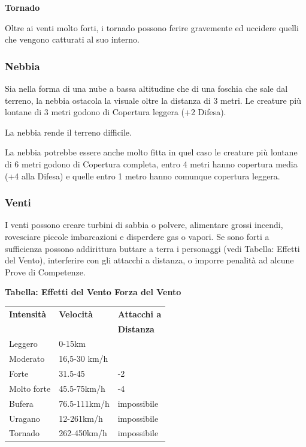 \begin{multicols}{2}
\textbf{Tornado}

Oltre ai venti molto forti, i tornado possono ferire gravemente ed uccidere quelli che vengono catturati al suo interno.

\subsubsection{Nebbia}

\label{nebbia}

Sia nella forma di una nube a bassa altitudine che di una foschia che sale dal terreno, la nebbia ostacola la visuale oltre la distanza di 3 metri. Le creature più lontane di 3 metri godono di Copertura leggera (+2 Difesa).

La nebbia rende il terreno difficile.

La nebbia potrebbe essere anche molto fitta in quel caso le creature più lontane di 6 metri godono di Copertura completa, entro 4 metri hanno copertura media (+4 alla Difesa) e quelle entro 1 metro hanno comunque copertura leggera.

\subsubsection{Venti}

\label{venti}

I venti possono creare turbini di sabbia o polvere, alimentare grossi incendi, rovesciare piccole imbarcazioni e disperdere gas o vapori. Se sono forti a sufficienza possono addirittura buttare a terra i personaggi (vedi Tabella: Effetti del Vento), interferire con gli attacchi a distanza, o imporre penalità ad alcune Prove di Competenze.

\medskip

\textbf{Tabella: Effetti del Vento Forza del Vento}

\medskip

\noindent\begin{tabularx}{\linewidth}{Xll}
	\toprule
\rowcolor{gray!20}\textbf{Intensità} & \textbf{Velocità} & \textbf{Attacchi a}\\
& & \textbf{Distanza}\\
\toprule
\rowcolor{gray!20}Leggero & 0-15km &\\
Moderato & 16,5-30 km/h& \\
\rowcolor{gray!20}Forte & 31.5-45 & -2 \\
Molto forte & 45.5-75km/h & -4 \\
\rowcolor{gray!20}Bufera & 76.5-111km/h & impossibile \\
Uragano & 12-261km/h & impossibile \\
\rowcolor{gray!20}Tornado & 262-450km/h & impossibile
\end{tabularx}


\end{multicols}
